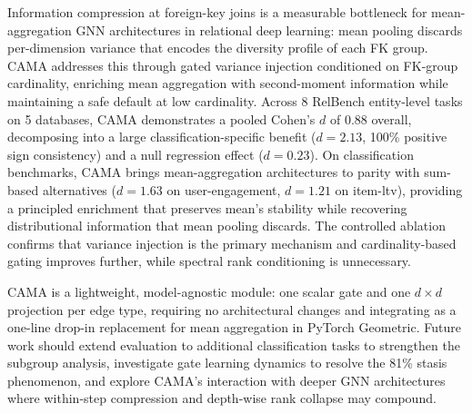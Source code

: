 \documentclass[11pt,letterpaper]{article}
\begin{document}
Information compression at foreign-key joins is a measurable bottleneck for mean-aggregation GNN architectures in relational deep learning: mean pooling discards per-dimension variance that encodes the diversity profile of each FK group. CAMA addresses this through gated variance injection conditioned on FK-group cardinality, enriching mean aggregation with second-moment information while maintaining a safe default at low cardinality. Across 8 RelBench entity-level tasks on 5 databases, CAMA demonstrates a pooled Cohen's $d$ of 0.88 overall, decomposing into a large classification-specific benefit ($d = 2.13$, 100\% positive sign consistency) and a null regression effect ($d = 0.23$). On classification benchmarks, CAMA brings mean-aggregation architectures to parity with sum-based alternatives ($d = 1.63$ on user-engagement, $d = 1.21$ on item-ltv), providing a principled enrichment that preserves mean's stability while recovering distributional information that mean pooling discards. The controlled ablation confirms that variance injection is the primary mechanism and cardinality-based gating improves further, while spectral rank conditioning is unnecessary.

CAMA is a lightweight, model-agnostic module: one scalar gate and one $d \times d$ projection per edge type, requiring no architectural changes and integrating as a one-line drop-in replacement for mean aggregation in PyTorch Geometric. Future work should extend evaluation to additional classification tasks to strengthen the subgroup analysis, investigate gate learning dynamics to resolve the 81\% stasis phenomenon, and explore CAMA's interaction with deeper GNN architectures where within-step compression and depth-wise rank collapse \citep{Roth2024a} may compound.


\end{document}
